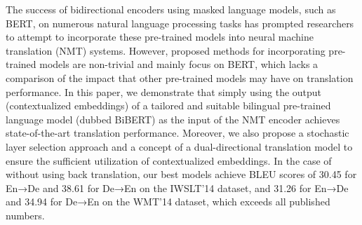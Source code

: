 The success of bidirectional encoders using masked language models, such as BERT, on numerous natural language processing tasks has prompted researchers to attempt to incorporate these pre-trained models into neural machine translation (NMT) systems. However, proposed methods for incorporating pre-trained models are non-trivial and mainly focus on BERT, which lacks a comparison of the impact that other pre-trained models may have on translation performance. In this paper, we demonstrate that simply using the output (contextualized embeddings) of a tailored and suitable bilingual pre-trained language model (dubbed BiBERT) as the input of the NMT encoder achieves state-of-the-art translation performance. Moreover, we also propose a stochastic layer selection approach and a concept of a dual-directional translation model to ensure the sufficient utilization of contextualized embeddings. In the case of without using back translation, our best models achieve BLEU scores of 30.45 for En→De and 38.61 for De→En on the IWSLT'14 dataset, and 31.26 for En→De and 34.94 for De→En on the WMT'14 dataset,  which exceeds all published numbers.
